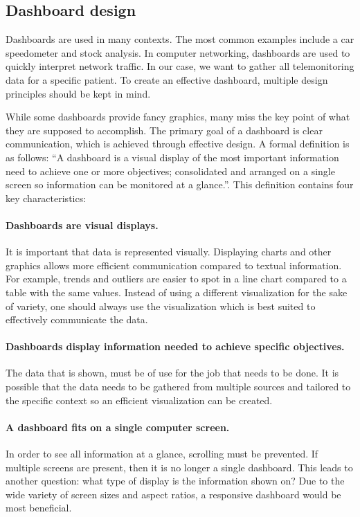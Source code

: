     \subsection{Dashboard design}\label{2_dashboards}

    Dashboards are used in many contexts. The most common examples include a car speedometer and stock analysis. In computer networking, dashboards are used to quickly interpret network traffic. In our case, we want to gather all telemonitoring data for a specific patient. To create an effective dashboard, multiple design principles should be kept in mind.
    
    While some dashboards provide fancy graphics, many miss the key point of what they are supposed to accomplish. The primary goal of a dashboard is clear communication, which is achieved through effective design. A formal definition is as follows: ``A dashboard is a visual display of the most important information need to achieve one or more objectives; consolidated and arranged on a single screen so information can be monitored at a glance.''\cite{dashboard}. This definition contains four key characteristics:

    \paragraph{Dashboards are visual displays.} It is important that data is represented visually. Displaying charts and other graphics allows more efficient communication compared to textual information. For example, trends and outliers are easier to spot in a line chart compared to a table with the same values. Instead of using a different visualization for the sake of variety, one should always use the visualization which is best suited to effectively communicate the data\cite{few2005intelligent}.

    \paragraph{Dashboards display information needed to achieve specific objectives.} The data that is shown, must be of use for the job that needs to be done. It is possible that the data needs to be gathered from multiple sources and tailored to the specific context so an efficient visualization can be created.

    \paragraph{A dashboard fits on a single computer screen.} In order to see all information at a glance, scrolling must be prevented. If multiple screens are present, then it is no longer a single dashboard. This leads to another question: what type of display is the information shown on? Due to the wide variety of screen sizes and aspect ratios, a responsive dashboard would be most beneficial.

